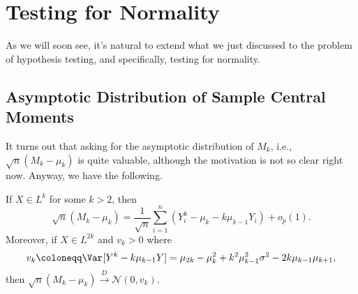 \section{Testing for Normality}
As we will soon see, it's natural to extend what we just discussed to the problem of hypothesis testing, and specifically, testing for normality.

\subsection{Asymptotic Distribution of Sample Central Moments}
It turns out that asking for the asymptotic distribution of \(M_k\), i.e., \(\sqrt{n} (M_k - \mu _k)\) is quite valuable, although the motivation is not so clear right now. Anyway, we have the following.

\begin{theorem}\label{thm:asymptotic-distribution-sample-central-moment}
	If \(X \in L^{k}\) for some \(k > 2\), then
	\[
		\sqrt{n} (M_k - \mu _k)
		= \frac{1}{\sqrt{n} } \sum_{i=1}^{n} (Y_i^k - \mu _k - k \mu _{k-1} Y_i) + o_p(1).
	\]
	Moreover, if \(X \in L^{2k}\) and \(v_k > 0\) where
	\[
		v_k
		\coloneqq \Var_{}[Y^k - k \mu _{k-1}Y]
		= \mu _{2k} - \mu _k^2 + k^2 \mu _{k-1}^2 \sigma ^2 - 2 k \mu _{k-1} \mu _{k+1} ,
	\]
	then \(\sqrt{n} (M_k - \mu _k) \overset{D}{\to} \mathcal{N} (0, v_k)\).
\end{theorem}
